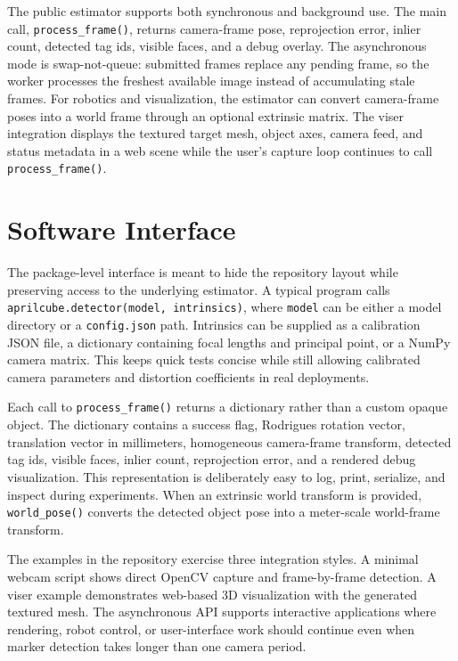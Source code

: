 \documentclass[conference]{IEEEtran}
\begin{document}
The public estimator supports both synchronous and background use. The main call, \texttt{process\_frame()}, returns camera-frame pose, reprojection error, inlier count, detected tag ids, visible faces, and a debug overlay. The asynchronous mode is swap-not-queue: submitted frames replace any pending frame, so the worker processes the freshest available image instead of accumulating stale frames. For robotics and visualization, the estimator can convert camera-frame poses into a world frame through an optional extrinsic matrix. The viser integration displays the textured target mesh, object axes, camera feed, and status metadata in a web scene while the user's capture loop continues to call \texttt{process\_frame()}.

\section{Software Interface}
The package-level interface is meant to hide the repository layout while preserving access to the underlying estimator. A typical program calls \texttt{aprilcube.detector(model, intrinsics)}, where \texttt{model} can be either a model directory or a \texttt{config.json} path. Intrinsics can be supplied as a calibration JSON file, a dictionary containing focal lengths and principal point, or a NumPy camera matrix. This keeps quick tests concise while still allowing calibrated camera parameters and distortion coefficients in real deployments.

Each call to \texttt{process\_frame()} returns a dictionary rather than a custom opaque object. The dictionary contains a success flag, Rodrigues rotation vector, translation vector in millimeters, homogeneous camera-frame transform, detected tag ids, visible faces, inlier count, reprojection error, and a rendered debug visualization. This representation is deliberately easy to log, print, serialize, and inspect during experiments. When an extrinsic world transform is provided, \texttt{world\_pose()} converts the detected object pose into a meter-scale world-frame transform.

The examples in the repository exercise three integration styles. A minimal webcam script shows direct OpenCV capture and frame-by-frame detection. A viser example demonstrates web-based 3D visualization with the generated textured mesh. The asynchronous API supports interactive applications where rendering, robot control, or user-interface work should continue even when marker detection takes longer than one camera period.
\end{document}

